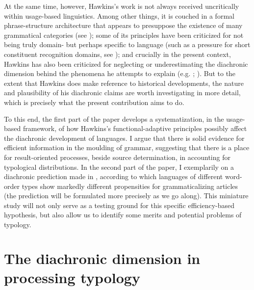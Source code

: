 \documentclass[output=paper]{langsci/langscibook}
\begin{document}
At the same time, however, Hawkins’s work is not always received uncritically within usage-based linguistics. Among other things, it is couched in a formal phrase-structure architecture that appears to presuppose the existence of many grammatical categories (see \citealt{Diessel2016_Corr}); some of its principles have been criticized for not being truly domain- but perhaps specific to language (such as a pressure for short constituent recognition domains, see \citealt{Bybee2010_Cogn}); and crucially in the present context, Hawkins has also been criticized for neglecting or underestimating the diachronic dimension behind the phenomena he attempts to explain (e.g. \citealt{Cristofaro2017_Dep}; ). But to the extent that Hawkins does make reference to historical developments, the nature and plausibility of his diachronic claims are worth investigating in more detail, which is precisely what the present contribution aims to do. 

To this end, the first part of the paper develops a systematization, in the usage-based framework, of how Hawkins’s functional-adaptive principles possibly affect the diachronic development of languages. I argue that there is solid evidence for efficient information  in the moulding of grammar, suggesting that there is a place for result-oriented processes, beside source determination, in accounting for typological distributions. In the second part of the paper, I exemplarily  on a diachronic prediction made in \citet{Hawkins2014_VarEff}, according to which languages of different word-order types show markedly different propensities for grammaticalizing  articles (the prediction will be formulated more precisely as we go along). This miniature  study will not only serve as a testing ground for this specific efficiency-based hypothesis, but also allow us to identify some  merits and potential problems of  typology.

\section{The diachronic dimension in processing typology} 
\end{document}
